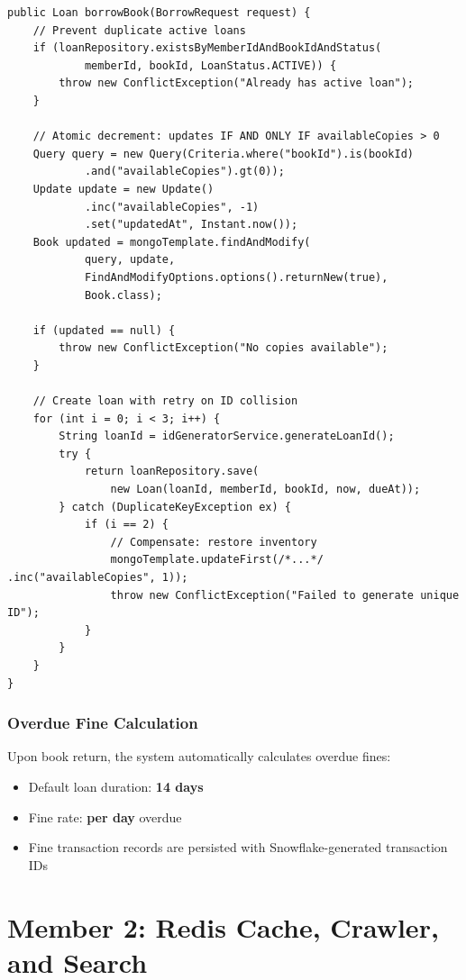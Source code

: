 \documentclass[12pt,a4paper]{report}
\begin{document}
\begin{lstlisting}[style=JavaStyle, caption={LoanService.java -- Atomic Borrow with Inventory Decrement}]
public Loan borrowBook(BorrowRequest request) {
    // Prevent duplicate active loans
    if (loanRepository.existsByMemberIdAndBookIdAndStatus(
            memberId, bookId, LoanStatus.ACTIVE)) {
        throw new ConflictException("Already has active loan");
    }

    // Atomic decrement: updates IF AND ONLY IF availableCopies > 0
    Query query = new Query(Criteria.where("bookId").is(bookId)
            .and("availableCopies").gt(0));
    Update update = new Update()
            .inc("availableCopies", -1)
            .set("updatedAt", Instant.now());
    Book updated = mongoTemplate.findAndModify(
            query, update,
            FindAndModifyOptions.options().returnNew(true),
            Book.class);

    if (updated == null) {
        throw new ConflictException("No copies available");
    }

    // Create loan with retry on ID collision
    for (int i = 0; i < 3; i++) {
        String loanId = idGeneratorService.generateLoanId();
        try {
            return loanRepository.save(
                new Loan(loanId, memberId, bookId, now, dueAt));
        } catch (DuplicateKeyException ex) {
            if (i == 2) {
                // Compensate: restore inventory
                mongoTemplate.updateFirst(/*...*/ .inc("availableCopies", 1));
                throw new ConflictException("Failed to generate unique ID");
            }
        }
    }
}
\end{lstlisting}

\subsection{Overdue Fine Calculation}
Upon book return, the system automatically calculates overdue fines:
\begin{itemize}[noitemsep]
    \item Default loan duration: \textbf{14 days}
    \item Fine rate: \textbf{ per day} overdue
    \item Fine transaction records are persisted with Snowflake-generated transaction IDs
\end{itemize}


\chapter{Member 2: Redis Cache, Crawler, and Search}
\end{document}

